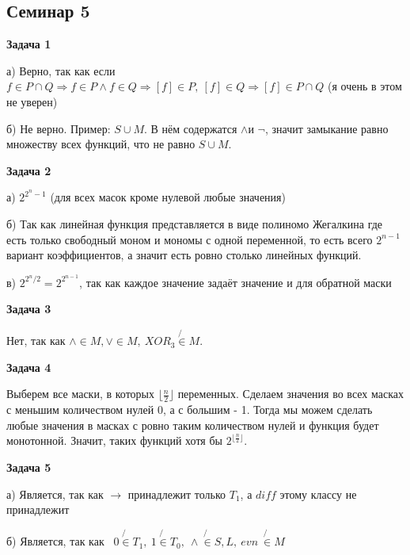\subsection{Семинар 5}
\begin{center}
\textbf{Задача 1}
\end{center}
а) Верно, так как если $\displaystyle f\in P\cap Q\Longrightarrow f\in P\land f\in Q\Longrightarrow [ f] \in P,\ [ f] \in Q\Longrightarrow [ f] \in P\cap Q$ (я очень в этом не уверен)

б) Не верно. Пример: $\displaystyle S\cup M$. В нём содержатся $\displaystyle \land $и $\displaystyle \neg $, значит замыкание равно множеству всех функций, что не равно $\displaystyle S\cup M$.

\begin{center}
\textbf{Задача 2}
\end{center}
а) $\displaystyle 2^{2^{n} -1}$ (для всех масок кроме нулевой любые значения)

б) Так как линейная функция представляется в виде полиномо Жегалкина где есть только свободный моном и мономы с одной переменной, то есть всего $\displaystyle 2^{n-1}$ вариант коэффициентов, а значит есть ровно столько линейных функций.

в) $\displaystyle 2^{2^{n} /2} =2^{2^{n-1}}$, так как каждое значение задаёт значение и для обратной маски

\begin{center}
\textbf{Задача 3}
\end{center}
Нет, так как $\displaystyle \land \in M,\lor \in M,\ XOR_{3}\not{\in } M$.

\begin{center}
\textbf{Задача 4}
\end{center}
Выберем все маски, в которых $\displaystyle \lfloor \frac{n}{2} \rfloor $ переменных. Сделаем значения во всех масках с меньшим количеством нулей 0, а с большим - 1. Тогда мы можем сделать любые значения в масках с ровно таким количеством нулей и функция будет монотонной. Значит, таких функций хотя бы $\displaystyle 2^{\lfloor \frac{n}{2} \rfloor }$.

\begin{center}
\textbf{Задача 5}
\end{center}
а) Является, так как $\displaystyle \rightarrow $ принадлежит только $\displaystyle T_{1}$, а $\displaystyle diff$ этому классу не принадлежит

б) Является, так как \ $\displaystyle 0\not{\in } T_{1} ,\ 1\not{\in } T_{0} ,\ \land \not{\in } S,L,\ evn\ \not{\in } M$

